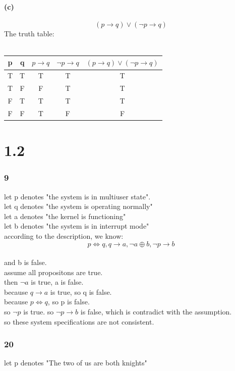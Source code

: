 \documentclass[UTF8]{ctexart}
\begin{document}
\subsection{(c)}
$$(p \to q)\vee (\neg p \to q)$$
The truth table:\\\\
\begin{tabular}{|c|c|c|c|c|}
    \hline
    p & q & $p \to q$ & $\neg p \to q$ & $(p \to q)\vee (\neg p \to q)$\\
    \hline
    T & T & T & T & T\\
    \hline
    T & F & F & T & T\\
    \hline
    F & T & T & T & T\\
    \hline
    F & F & T & F & F\\
    \hline
    
\end{tabular}
\part{1.2}
\section{9}
let p denotes "the system is in multiuser state".\\
let q denotes "the system is operating normally"\\
let a denotes "the kernel is functioning"\\
let b denotes "the system is in interrupt mode"\\
according to the description, we know:\\
$$p \Leftrightarrow q, q \rightarrow a, \neg a \oplus b, \neg p \rightarrow b$$\\
and b is false.\\
assume all propositons are true.\\
then $\neg a$ is true, a is false.\\
because $q\to a$ is true, so q is false.\\
because $p \Leftrightarrow q$, so p is false.\\
so $\neg p$ is true. so $\neg p \to b$ is false, which is contradict with the assumption.\\
so these system specifications are not consistent. 
\section{20}
let p denotes "The two of us are both knights"
\end{document}
